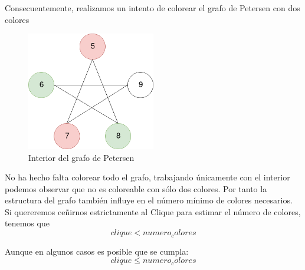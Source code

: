\documentclass{article}
\begin{document}
Consecuentemente, realizamos un intento de colorear el grafo de Petersen con dos colores 
\begin{figure}[H]
    \centering
    \includegraphics[width=0.5\textwidth]{pictures/interior.png}
    \caption{Interior del grafo de Petersen}
\end{figure}

No ha hecho falta colorear todo el grafo, trabajando únicamente con el interior podemos observar que no es coloreable con sólo dos colores.  
Por tanto la estructura del grafo también influye en el número mínimo de colores necesarios. Si quereremos ceñirnos estrictamente al Clique 
para estimar el número de colores, tenemos que 
    \[clique < numero_colores \] 

Aunque en algunos casos es posible que se cumpla: 
    \[clique \leq numero_colores\]
    
 

\end{document}

